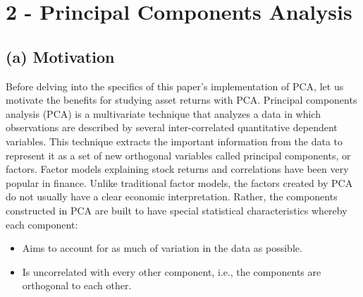 \documentclass[12pt,twoside]{article}
\begin{document}
\section*{2 - Principal Components Analysis}
\subsection*{(a) Motivation}

Before delving into the specifics of this paper’s implementation of PCA, let us motivate the benefits for studying asset returns with PCA. Principal components analysis (PCA) is a multivariate technique that analyzes a data in which observations are described by several inter-correlated quantitative dependent variables. This technique extracts the important information from the data to represent it as a set of new orthogonal variables called principal components, or factors.
\bigbreak
Factor models explaining stock returns and correlations have been very popular in finance. Unlike traditional factor models, the factors created by PCA do not usually have a clear economic interpretation. Rather, the components constructed in PCA are built to have special statistical characteristics whereby each component: 
\begin{itemize}
	\item Aims to account for as much of variation in the data as possible.
	\item Is uncorrelated with every other component, i.e., the components are orthogonal to each other.
\end{itemize}
\end{document}
